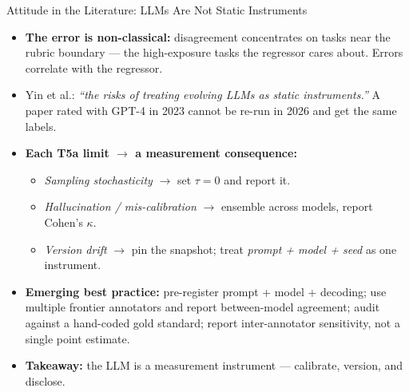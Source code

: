 \begin{frame}{Attitude in the Literature: LLMs Are Not Static Instruments}
\begin{itemize}
\item \textbf{The error is non-classical:} disagreement concentrates on tasks near the rubric boundary --- the high-exposure tasks the regressor cares about. Errors correlate with the regressor.

\medskip
\item Yin et al.: \emph{``the risks of treating evolving LLMs as static instruments.''} A paper rated with GPT-4 in 2023 cannot be re-run in 2026 and get the same labels.

\medskip
\item \textbf{Each T5a limit $\to$ a measurement consequence:}
\begin{itemize}
\item \emph{Sampling stochasticity} $\to$ set $\tau = 0$ and report it.
\item \emph{Hallucination / mis-calibration} $\to$ ensemble across models, report Cohen's $\kappa$.
\item \emph{Version drift} $\to$ pin the snapshot; treat \emph{prompt + model + seed} as one instrument.
\end{itemize}

\medskip
\item \textbf{Emerging best practice:} pre-register prompt + model + decoding; use multiple frontier annotators and report between-model agreement; audit against a hand-coded gold standard; report inter-annotator sensitivity, not a single point estimate.

\medskip
\item \textbf{Takeaway:} the LLM is a measurement instrument --- calibrate, version, and disclose.
\end{itemize}
\end{frame}

